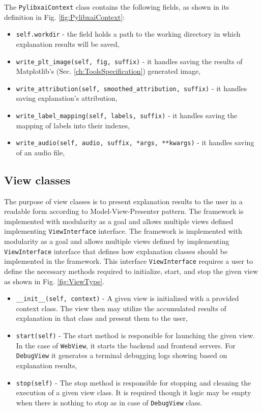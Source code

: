 \documentclass[
    bindingoffset=5mm,  %
    footnoteindent=3mm, %
    hyphenation=true    %
]{src/wut-thesis}
\begin{document}
The \texttt{PylibxaiContext} class contains the following fields, as shown in its definition in Fig. \ref{fig:PylibxaiContext}:

\begin{itemize}
    \item \texttt{self.workdir} - the field holds a path to the working directory in which explanation results will be saved,
    \item \texttt{write_plt_image(self, fig, suffix)} - it handles saving the results of Matplotlib's (Sec. \ref{ch:ToolsSpecification}) generated image,
    \item \texttt{write_attribution(self, smoothed_attribution, suffix)} - it handles saving explanation's attribution,
    \item \texttt{write_label_mapping(self, labels, suffix)} - it handles saving the mapping of labels into their indexes,
    \item \texttt{write_audio(self, audio, suffix, *args, **kwargs)} - it handles saving of an audio file,
\end{itemize}

\subsection{View classes}

The purpose of view classes is to present explanation results to the user in a readable form
according to Model-View-Presenter pattern. The framework is implemented with modularity as a goal
and allows multiple views defined implementing \texttt{ViewInterface} interface.
The framework is implemented with modularity as a goal and allows multiple views
defined by implementing \texttt{ViewInterface} interface that defines how explanation
classes should be implemented in the framework.
This interface \texttt{ViewInterface} requires a user to define the necessary
methods required to initialize, start, and stop the given view as shown in Fig. \ref{fig:ViewType}.

\begin{itemize}
    \item \texttt{__init__(self, context)} - A given view is initialized with a provided context class.
    The view then may utilize the accumulated results of explanation in that class and present them to the user,

    \item \texttt{start(self)} - The start method is responsible for launching the given view. In the case of \texttt{WebView},
    it starts the backend and frontend servers. For \texttt{DebugView} it generates a terminal debugging logs showing based on 
    explanation results,
    
    \item \texttt{stop(self)} - The stop method is responsible for stopping and cleaning the execution of a given view class. It is required though it logic may be empty when there is nothing to stop as in case of \texttt{DebugView} class.
\end{itemize}
\end{document}

